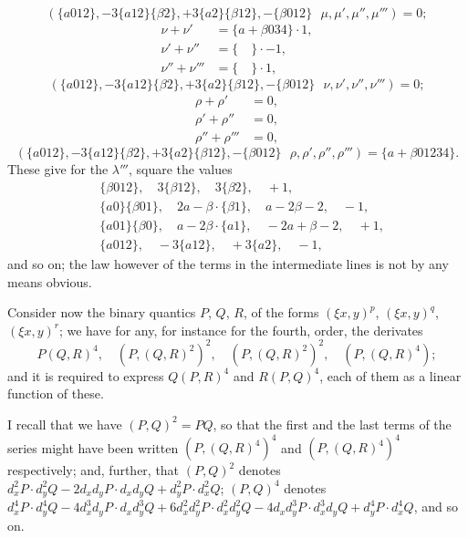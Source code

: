 \documentclass[11pt,a4paper]{book}
\begin{document}
\[
(\{a012\}, -3\{a12\}\{\beta2\}, +3\{a2\}\{\beta12\}, -\{\beta012\} \,\,\,\, \mu, \mu', \mu'', \mu''') = 0;
\]
\begin{align*}
\nu + \nu' &= \{a + \beta 034\} \cdot 1, \\
\nu' + \nu'' &= \{ \quad \} \cdot -1, \\
\nu'' + \nu''' &= \{ \quad \} \cdot 1,
\end{align*}
\[
(\{a012\}, -3\{a12\}\{\beta2\}, +3\{a2\}\{\beta12\}, -\{\beta012\} \,\,\,\, \nu, \nu', \nu'', \nu''') = 0;
\]
\begin{align*}
\rho + \rho' &= 0, \\
\rho' + \rho'' &= 0, \\
\rho'' + \rho''' &= 0,
\end{align*}
\[
(\{a012\}, -3\{a12\}\{\beta2\}, +3\{a2\}\{\beta12\}, -\{\beta012\} \,\,\,\, \rho, \rho', \rho'', \rho''') = \{a + \beta 01234\}.
\]
These give for the $\lambda'''$, square the values
\begin{align*}
&\{\beta 012\}, \quad 3\{\beta 12\}, \quad 3\{\beta 2\}, \quad +1, \\
&\{a0\}\{\beta 01\}, \quad 2a - \beta \cdot \{\beta 1\}, \quad a - 2\beta - 2, \quad -1, \\
&\{a01\}\{\beta 0\}, \quad a - 2\beta \cdot \{a1\}, \quad -2a + \beta - 2, \quad +1, \\
&\{a012\}, \quad -3\{a12\}, \quad +3\{a2\}, \quad -1,
\end{align*}
and so on; the law however of the terms in the intermediate lines is not by any means obvious.

Consider now the binary quantics $P$, $Q$, $R$, of the forms $(\xi x, y)^p$, $(\xi x, y)^q$, $(\xi x, y)^r$; we have for any, for instance for the fourth, order, the derivates
\[
P(Q, R)^4, \quad (P, (Q, R)^2)^2, \quad (P, (Q, R)^2)^2, \quad (P, (Q, R)^4);
\]
and it is required to express $Q(P, R)^4$ and $R(P, Q)^4$, each of them as a linear function of these.

I recall that we have $(P, Q)^2 = PQ$, so that the first and the last terms of the series might have been written $(P, (Q, R)^4)^4$ and $(P, (Q, R)^4)^4$ respectively; and, further, that $(P, Q)^2$ denotes $d_x^2 P \cdot d_y^2 Q - 2d_x d_y P \cdot d_x d_y Q + d_y^2 P \cdot d_x^2 Q$; $(P, Q)^4$ denotes $d_x^4 P \cdot d_y^4 Q - 4d_x^3 d_y P \cdot d_x d_y^3 Q + 6d_x^2 d_y^2 P \cdot d_x^2 d_y^2 Q - 4d_x d_y^3 P \cdot d_x^3 d_y Q + d_y^4 P \cdot d_x^4 Q$, and so on.
\end{document}
